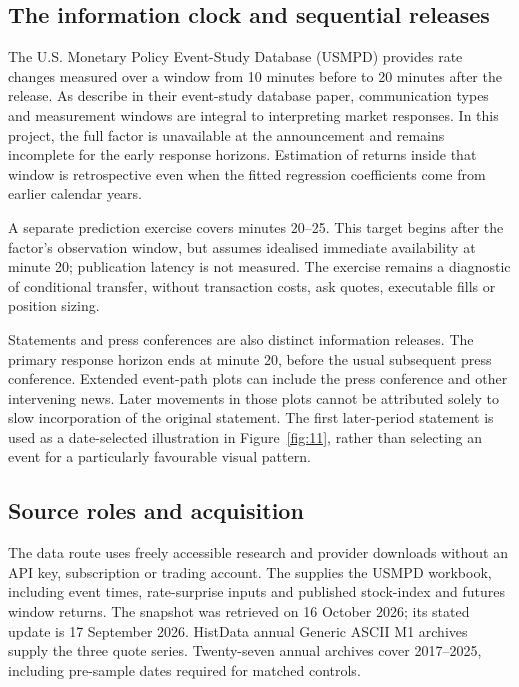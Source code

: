 \subsection{The information clock and sequential releases}
The U.S. Monetary Policy Event-Study Database (USMPD) provides rate changes measured over a window from 10 minutes before to 20 minutes after the release. As  describe in their event-study database paper, communication types and measurement windows are integral to interpreting market responses. In this project, the full factor is unavailable at the announcement and remains incomplete for the early response horizons. Estimation of returns inside that window is retrospective even when the fitted regression coefficients come from earlier calendar years.

A separate prediction exercise covers minutes 20--25. This target begins after the factor's observation window, but assumes idealised immediate availability at minute 20; publication latency is not measured. The exercise remains a diagnostic of conditional transfer, without transaction costs, ask quotes, executable fills or position sizing.

Statements and press conferences are also distinct information releases. The primary response horizon ends at minute 20, before the usual subsequent press conference. Extended event-path plots can include the press conference and other intervening news. Later movements in those plots cannot be attributed solely to slow incorporation of the original statement. The first later-period statement is used as a date-selected illustration in Figure~\ref{fig:11}, rather than selecting an event for a particularly favourable visual pattern.

\label{sec:data}
\subsection{Source roles and acquisition}
The data route uses freely accessible research and provider downloads without an API key, subscription or trading account. The  supplies the USMPD workbook, including event times, rate-surprise inputs and published stock-index and futures window returns. The snapshot was retrieved on 16 October 2026; its stated update is 17 September 2026. HistData annual Generic ASCII M1 archives supply the three quote series. Twenty-seven annual archives cover 2017--2025, including pre-sample dates required for matched controls.

